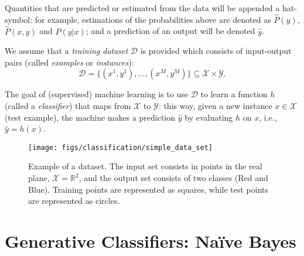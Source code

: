 Quantities that are predicted or estimated from the data will be appended a hat-symbol: for example, estimations of the probabilities above are denoted 
as ${\hat P}(y)$, ${\hat P}(x,y)$ and ${\hat P}(y|x)$; and a prediction of an output will be denoted ${\hat y}$. 

We assume that a \emph{training dataset} $\mathcal{D}$ is provided
which consists of input-output pairs (called \emph{examples} or
\emph{instances}): 
\begin{equation}
\mathcal{D} = \{(x^{1},y^{1}),\ldots,(x^{M},y^{M})\} \subseteq \mathcal{X} \times \mathcal{Y}.  
\end{equation}

The goal of (supervised) machine learning is to use $\mathcal{D}$ to learn a function $h$ (called a \emph{classifier}) 
that maps from $\mathcal{X}$ to $\mathcal{Y}$: this way, given a new instance 
$x \in \mathcal{X}$ (test example), the machine makes a prediction ${\hat y}$ by evaluating $h$ on $x$, i.e., ${\hat y} = h(x)$. 

\begin{figure}
\begin{center}
    \texttt{[image: figs/classification/simple\_data\_set]}
  \caption{\label{simpleDataSet} Example of a dataset.
    The input set consists in points in the real plane, $\mathcal{X} =
    \mathbb{R}^2$, and the output set consists of two classes (Red
    and Blue). Training points are represented as squares, while test
    points are represented as circles.}
  \end{center}
\end{figure}


\section{\label{s::naiveBayes}Generative Classifiers: Na\"{i}ve Bayes}

